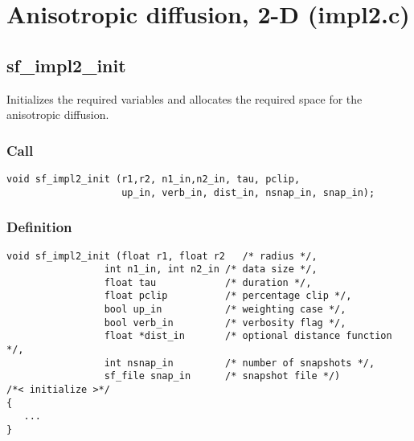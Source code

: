 \section{Anisotropic diffusion, 2-D (impl2.c)}




\subsection{{sf\_impl2\_init}}\label{sec:sf_impl2_init}
Initializes the required variables and allocates the required space for the anisotropic diffusion.

\subsubsection*{Call}
\begin{verbatim}
void sf_impl2_init (r1,r2, n1_in,n2_in, tau, pclip, 
                    up_in, verb_in, dist_in, nsnap_in, snap_in);
\end{verbatim}

\subsubsection*{Definition}
\begin{verbatim}
void sf_impl2_init (float r1, float r2   /* radius */, 
                 int n1_in, int n2_in /* data size */, 
                 float tau            /* duration */, 
                 float pclip          /* percentage clip */, 
                 bool up_in           /* weighting case */,
                 bool verb_in         /* verbosity flag */,
                 float *dist_in       /* optional distance function */,
                 int nsnap_in         /* number of snapshots */,
                 sf_file snap_in      /* snapshot file */)
/*< initialize >*/
{
   ...
}
\end{verbatim}

